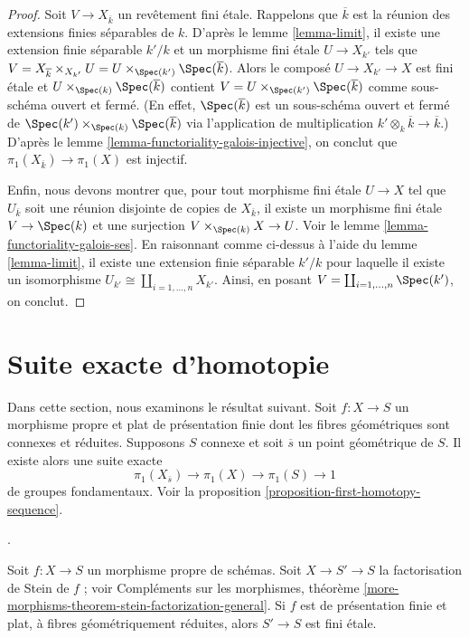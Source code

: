 \begin{proof}
\medskip\noindent
Soit $V \to X_{\overline{k}}$ un revêtement fini \'etale. Rappelons que
$\overline{k}$ est la réunion des extensions finies séparables de $k$.
D'après le lemme \ref{lemma-limit}, il existe une extension finie séparable $k'/k$
et un morphisme fini \'etale $U \to X_{k'}$ tels que
$V = X_{\overline{k}} \times_{X_{k'}} U =
U \times_{\Spec(k')} \Spec(\overline{k})$.
Alors le composé $U \to X_{k'} \to X$ est fini \'etale
et $U \times_{\Spec(k)} \Spec(\overline{k})$
contient $V = U \times_{\Spec(k')} \Spec(\overline{k})$
comme sous-schéma ouvert et fermé. (En effet, $\Spec(\overline{k})$
est un sous-schéma ouvert et fermé de
$\Spec(k') \times_{\Spec(k)} \Spec(\overline{k})$ via
l'application de multiplication $k' \otimes_k \overline{k} \to \overline{k}$.) D'après le
lemme \ref{lemma-functoriality-galois-injective},
on conclut que $\pi_1(X_{\overline{k}}) \to \pi_1(X)$ est injectif.

\medskip\noindent
Enfin, nous devons montrer que, pour tout morphisme fini \'etale
$U \to X$ tel que $U_{\overline{k}}$ soit une réunion disjointe
de copies de $X_{\overline{k}}$, il existe un morphisme fini \'etale
$V \to \Spec(k)$ et une surjection $V \times_{\Spec(k)} X \to U$.
Voir le lemme \ref{lemma-functoriality-galois-ses}.
En raisonnant comme ci-dessus à l'aide du lemme \ref{lemma-limit},
il existe une extension finie séparable $k'/k$
pour laquelle il existe un isomorphisme
$U_{k'} \cong \coprod_{i = 1, \ldots, n} X_{k'}$.
Ainsi, en posant $V = \coprod_{i = 1, \ldots, n} \Spec(k')$,
on conclut.
\end{proof}






\section{Suite exacte d'homotopie}
\label{section-homotopy-exact-sequence}

\noindent
Dans cette section, nous examinons le résultat suivant.
Soit $f : X \to S$ un morphisme propre et plat de
présentation finie dont les
fibres géométriques sont connexes et réduites.
Supposons $S$ connexe et soit $\overline{s}$
un point géométrique de $S$. Il existe alors une suite
exacte
$$
\pi_1(X_{\overline{s}}) \to \pi_1(X) \to \pi_1(S) \to 1
$$
de groupes fondamentaux. Voir la
proposition \ref{proposition-first-homotopy-sequence}.

\begin{lemma}
\label{lemma-stein-factorization-etale}
\begin{reference}
\cite[Exposé X, proposition 1.2, p. 262]{SGA1}.
\end{reference}
Soit $f : X \to S$ un morphisme propre de schémas.
Soit $X \to S' \to S$ la factorisation de Stein de $f$ ; voir
Compléments sur les morphismes, théorème
\ref{more-morphisms-theorem-stein-factorization-general}.
Si $f$ est de présentation finie et plat, à fibres géométriquement
réduites, alors $S' \to S$ est fini \'etale.
\end{lemma}

